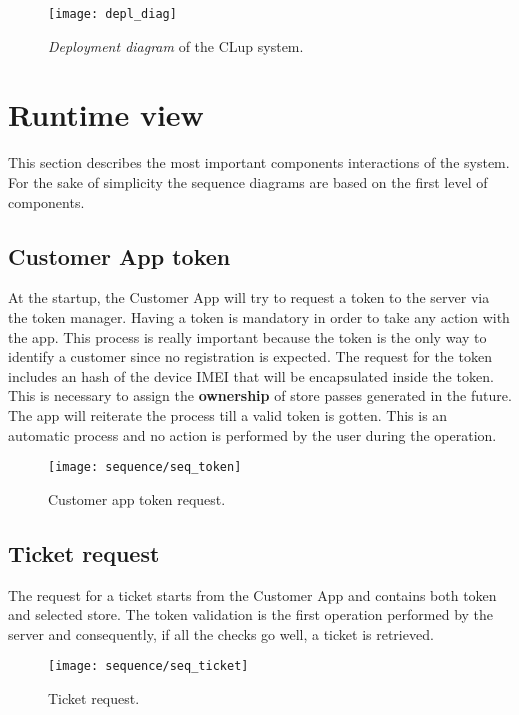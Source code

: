 \begin{figure}[H]
	\centering
	\texttt{[image: depl\_diag]}
	\caption{\textit{Deployment diagram} of the CLup system.}
	\label{fig:depl_diag}
\end{figure}
\clearpage

\section{Runtime view}
This section describes the most important components interactions of the system.\newline
For the sake of simplicity the sequence diagrams are based on the first level of components. 
\subsection{Customer App token}
At the startup, the Customer App will try to request a token to the server via the token manager. Having a token is mandatory in order to take any action with the app.\newline
This process is really important because the token is the only way to identify a customer since no registration is expected. The request for the token includes an hash of the device IMEI that will be encapsulated inside the token. This is necessary to assign the \textbf{ownership} of store passes generated in the future.\newline
The app will reiterate the process till a valid token is gotten. This is an automatic process and no action is performed by the user during the operation.
\begin{figure}[H]
	\centering
	\texttt{[image: sequence/seq\_token]}
	\caption{Customer app token request.}
	\label{fig:seq_token}
\end{figure}
\clearpage

\subsection{Ticket request}
The request for a ticket starts from the Customer App and contains both token and selected store. The token validation is the first operation performed by the server and consequently, if all the checks go well, a ticket is retrieved.
\vspace{0.1cm}
\begin{figure}[H]
	\centering
	\texttt{[image: sequence/seq\_ticket]}
	\caption{Ticket request.}
	\label{fig:seq_ticket}
\end{figure}

